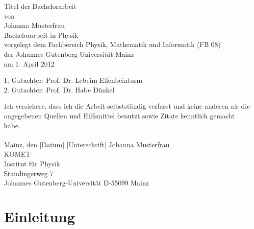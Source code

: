 \documentclass[a4paper,11pt,oneside,final,german,openbib,pdftex]{scrbook}
\begin{document}

\begin{titlepage}
  \vspace*{6mm}
  \begin{center}
     {\afont Titel der Bachelorarbeit}
     \\[3.5cm]
     {\large von}
     \\[3.5cm]
     {\dfont Johanna Musterfrau}
     \\[2cm]
     {\large Bachelorarbeit in Physik \/\\
        vorgelegt dem Fachbereich Physik, Mathematik und Informatik (FB 08) \/\\
        der Johannes Gutenberg-Universit\"at Mainz \/\\
        am 1. April 2012}
   \end{center}
   \vfill
   1. Gutachter: Prof. Dr. Lebeim Elfenbeinturm\\	
   2. Gutachter: Prof. Dr. Habe D\"unkel \\
   \vfill
\end{titlepage}

\thispagestyle{empty}
Ich versichere, dass ich die Arbeit selbstst\"andig verfasst und keine 
anderen als die angegebenen Quellen und Hilfsmittel benutzt sowie 
Zitate kenntlich gemacht habe.
\\
\\[3.5cm] 
Mainz, den [Datum] [Unterschrift]
\vfill
\noindent 
Johanna Musterfrau\\
KOMET\\
Institut f\"ur Physik\\
Staudingerweg 7\\
Johannes Gutenberg-Universit\"at
D-55099 Mainz\\

\renewcommand\contentsname{Inhaltsverzeichnis}
\renewcommand\figurename{Abbildung}
\renewcommand\tablename{Tabelle}
\tableofcontents
\clearpage

\mainmatter
\sloppy

\chapter{Einleitung}
\end{document}
